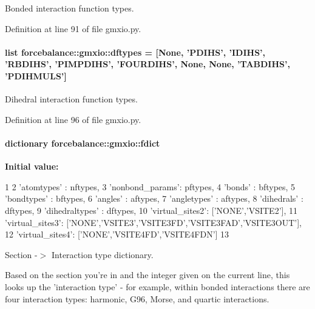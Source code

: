 \-Bonded interaction function types. 



\-Definition at line 91 of file gmxio.\-py.

\hypertarget{namespaceforcebalance_1_1gmxio_a5520b315e210120bb3e14af3665d568c}{
\paragraph[{dftypes}]{\setlength{\rightskip}{0pt plus 5cm}list {\bf forcebalance\-::gmxio\-::dftypes} = \mbox{[}\-None, '\-P\-D\-I\-H\-S', '\-I\-D\-I\-H\-S', '\-R\-B\-D\-I\-H\-S', '\-P\-I\-M\-P\-D\-I\-H\-S', '\-F\-O\-U\-R\-D\-I\-H\-S', \-None, \-None, '\-T\-A\-B\-D\-I\-H\-S', '\-P\-D\-I\-H\-M\-U\-L\-S'\mbox{]}}}\label{namespaceforcebalance_1_1gmxio_a5520b315e210120bb3e14af3665d568c}


\-Dihedral interaction function types. 



\-Definition at line 96 of file gmxio.\-py.

\hypertarget{namespaceforcebalance_1_1gmxio_ac4e46dd6adabe0dfdeddcd86e772ad33}{
\paragraph[{fdict}]{\setlength{\rightskip}{0pt plus 5cm}dictionary {\bf forcebalance\-::gmxio\-::fdict}}}\label{namespaceforcebalance_1_1gmxio_ac4e46dd6adabe0dfdeddcd86e772ad33}
{\bfseries \-Initial value\-:}
\begin{DoxyCode}
1 {
2     'atomtypes'     : nftypes,
3     'nonbond_params': pftypes,
4     'bonds'         : bftypes,
5     'bondtypes'     : bftypes,
6     'angles'        : aftypes,
7     'angletypes'    : aftypes,
8     'dihedrals'     : dftypes,
9     'dihedraltypes' : dftypes,
10     'virtual_sites2': ['NONE','VSITE2'],
11     'virtual_sites3': ['NONE','VSITE3','VSITE3FD','VSITE3FAD','VSITE3OUT'],
12     'virtual_sites4': ['NONE','VSITE4FD','VSITE4FDN']
13     }
\end{DoxyCode}


\-Section -\/$>$ \-Interaction type dictionary. 

\-Based on the section you're in and the integer given on the current line, this looks up the 'interaction type' -\/ for example, within bonded interactions there are four interaction types\-: harmonic, \-G96, \-Morse, and quartic interactions. 

